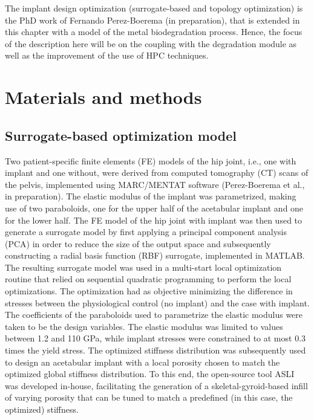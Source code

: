 The implant design optimization (surrogate-based and topology optimization) is the PhD work of Fernando Perez-Boerema (in preparation), that is extended in this chapter with a model of the metal biodegradation process. Hence, the focus of the description here will be on the coupling with the degradation module as well as the improvement of the use of HPC techniques.


\section{Materials and methods}

\subsection{Surrogate-based optimization model}


Two patient-specific finite elements (FE) models of the hip joint, i.e., one with implant and one without, were derived from computed tomography (\gls{CT}) scans of the pelvis, implemented using MARC/MENTAT software (Perez-Boerema et al., in preparation). The elastic modulus of the implant was parametrized, making use of two paraboloids, one for the upper half of the acetabular implant and one for the lower half. The FE model of the hip joint with implant was then used to generate a surrogate model by first applying a principal component analysis (\gls{PCA}) in order to reduce the size of the output space and subsequently constructing a radial basis function (\gls{RBF}) surrogate, implemented in MATLAB. The resulting surrogate model was used in a multi-start local optimization routine that relied on sequential quadratic programming to perform the local optimizations. The optimization had as objective minimizing the difference in stresses between the physiological control (no implant) and the case with implant. The coefficients of the paraboloids used to parametrize the elastic modulus were taken to be the design variables. The elastic modulus was limited to values between 1.2 and 110 GPa, while implant stresses were constrained to at most 0.3 times the yield stress. The optimized stiffness distribution was subsequently used to design an acetabular implant with a local porosity chosen to match the optimized global stiffness distribution. To this end, the open-source tool ASLI \cite{Perez-Boerema2022} was developed in-house, facilitating the generation of a skeletal-gyroid-based infill of varying porosity that can be tuned to match a predefined (in this case, the optimized) stiffness.

